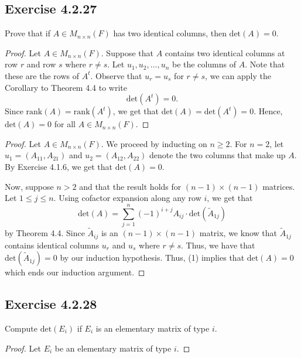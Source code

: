 \subsection*{Exercise 4.2.27} Prove that if \( A \in {M}_{n \times n}(F) \) has two identical columns, then \( \text{det}(A) = 0  \).
\begin{proof}
    Let \( A \in {M}_{n \times n}(F) \). Suppose that \( A  \) contains two identical columns at row \( r  \) and row \( s  \) where \( r \neq s  \). Let \( {u}_{1}, {u}_{2}, \dots, {u}_{n}  \) be the columns of \( A \). Note that these are the rows of \( A^{t} \). Observe that \( {u}_{r} = {u}_{s} \) for \( r \neq s  \), we can apply the Corollary to Theorem 4.4 to write  
    \[  \text{det}(A^{t}) = 0.  \]
    Since \( \text{rank}(A) = \text{rank}(A^{t}) \), we get that \( \text{det}(A) = \text{det}(A^{t}) = 0  \). Hence, \( \text{det}(A) = 0 \) for all \( A \in {M}_{n \times n}(F)  \).
\end{proof}
\begin{proof}
Let \( A \in {M}_{n \times n}(F) \). We proceed by inducting on \( n \geq 2  \). For \( n = 2  \), let \( {u}_{1} = ({A}_{11}, {A}_{21}) \) and \( {u}_{2} = ({A}_{12}, {A}_{22} ) \) denote the two columns that make up \( A  \). By Exercise 4.1.6, we get that \( \text{det}(A) = 0  \).     

Now, suppose \( n > 2  \) and that the result holds for \( (n-1) \times (n-1)  \) matrices. Let \( 1 \leq j \leq n \). Using cofactor expansion along any row \( i \), we get that 
\[  \text{det}(A) = \sum_{ j=1 }^{ n } (-1)^{i + j} {A}_{ij} \cdot \text{det}({\tilde{A}}_{1j}) \tag{1} \] by Theorem 4.4.
Since \( {\tilde{A}}_{ij} \) is an \( (n-1) \times (n-1)  \) matrix, we know that \( {\tilde{A}}_{1j} \) contains identical columns \( {u}_{r}   \) and \( {u}_{s} \) where \( r \neq s  \). Thus, we have that \( \text{det}({\tilde{A}}_{1j}) = 0  \) by our induction hypothesis. Thus, (1) implies that \( \text{det}(A) = 0  \) which ends our induction argument. 
\end{proof}

\subsection*{Exercise 4.2.28} Compute \( \text{det}({E}_{i})  \) if \( {E}_{i} \) is an elementary matrix of type \( i  \).
\begin{proof}
Let \( {E}_{i} \) be an elementary matrix of type \( i \).
\end{proof}

